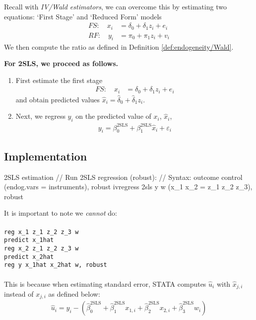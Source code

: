             Recall with \textit{IV/Wald estimators}, we can overcome this by estimating two equations: `First Stage' and `Reduced Form' models
            \begin{align}
                FS:\quad x_i &= \delta_0 + \delta_1 z_i + e_i\\
                RF:\quad y_i &= \pi_0 + \pi_1 z_i + v_i
            \end{align}
            We then compute the ratio as defined in Definition \ref{def:endogeneity/Wald}.

            \textbf{For 2SLS, we proceed as follows.} 
            \begin{enumerate}
                \item First estimate the first stage
                \begin{align}
                    FS:\quad x_i &= \delta_0 + \delta_1 z_i + e_i
                \end{align}
                and obtain predicted values $\hat x_i = \hat\delta_0 + \hat\delta_1 z_i$.
                
                \item Next, we regress $y_i$ on the predicted value of $x_i$, $\hat x_i$,
                \begin{align}
                    y_i = \beta_0^\mathrm{2SLS} + \beta_1^\mathrm{2SLS} \hat x_i + \varepsilon_i
                \end{align}
            \end{enumerate}


        \subsection{Implementation}
            
            \begin{sexylisting}[colback=white, label=lst:endogeneity/2SLS/implement]{2SLS estimation}
//  Run 2SLS regression (robust): 
//  Syntax: outcome control (endog.vars = instruments), robust
ivregress 2sls y w (x_1 x_2 = z_1 z_2 z_3), robust
            \end{sexylisting}
            \noindent It is important to note we \textit{cannot} do:\\ \\
            \indent\verb|reg x_1 z_1 z_2 z_3 w|    \\
            \indent\verb|predict x_1hat|   \\
            \indent\verb|reg x_2 z_1 z_2 z_3 w|    \\
            \indent\verb|predict x_2hat|   \\
            \indent\verb|reg y x_1hat x_2hat w, robust|\\ \\
            This is because when estimating standard error, STATA computes $\hat u_i$ with $\hat x_{j,i}$ instead of $x_{j,i}$ as defined below:
            \begin{align}
                \hat u_i = y_i - \left(\hat\beta_0^\mathrm{2SLS}+\hat\beta_1^\mathrm{2SLS} x_{1,i}+\hat\beta_2^\mathrm{2SLS}  x_{2,i}+\hat\beta_3^\mathrm{2SLS} w_i\right)
            \end{align}
            
